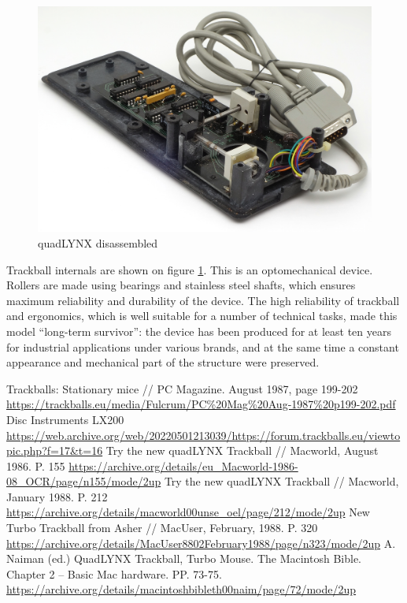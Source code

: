 \documentclass[11pt, a4paper]{article}
\begin{document}
\begin{figure}[h]
    \centering
    \includegraphics[scale=0.52]{1986_honeywell_asher_quadlynx_trackball/inside_30.jpg}
    \caption{quadLYNX disassembled}
    \label{fig:quadLYNXInside}
\end{figure}

Trackball internals are shown on figure \ref{fig:quadLYNXInside}. This is an optomechanical device. Rollers are made using bearings and stainless steel shafts, which ensures maximum reliability and durability of the device. The high reliability of trackball and ergonomics, which is well suitable for a number of technical tasks, made this model “long-term survivor”: the device has been produced for at least ten years for industrial applications under various brands, and at the same time a constant appearance and mechanical part of the structure were preserved.

\begin{thebibliography}{9}
 Trackballs: Stationary mice // PC Magazine. August 1987, page 199-202 \url{https://trackballs.eu/media/Fulcrum/PC%20Mag%20Aug-1987%20p199-202.pdf}
 Disc Instruments LX200 \url{https://web.archive.org/web/20220501213039/https://forum.trackballs.eu/viewtopic.php?f=17&t=16}
 Try the new quadLYNX Trackball // Macworld, August 1986. P. 155  \url{https://archive.org/details/eu_Macworld-1986-08_OCR/page/n155/mode/2up}
 Try the new quadLYNX Trackball // Macworld, January 1988. P. 212 \url{https://archive.org/details/macworld00unse_oel/page/212/mode/2up}
 New Turbo Trackball from Asher // MacUser, February, 1988. P. 320 
\url{https://archive.org/details/MacUser8802February1988/page/n323/mode/2up}
 A. Naiman (ed.) QuadLYNX Trackball, Turbo Mouse. The Macintosh Bible. Chapter 2 -- Basic Mac hardware. PP. 73-75. \url{https://archive.org/details/macintoshbibleth00naim/page/72/mode/2up}
\end{thebibliography}
\end{document}
